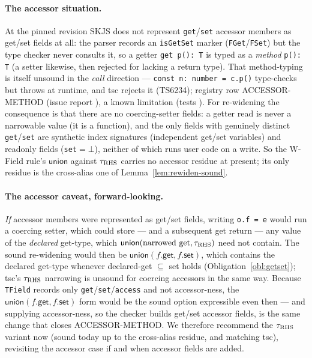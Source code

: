 \documentclass[11pt]{article}
\begin{document}
\paragraph{The accessor situation.}
At the pinned revision SKJS does not represent \texttt{get}/\texttt{set}
accessor members as get/set fields at all: the parser records an
\texttt{isGetSet} marker (\texttt{FGet}/\texttt{FSet}) but the type
checker never consults it, so a getter \texttt{get p(): T} is typed as a
\emph{method} \texttt{p(): T} (a setter likewise, then rejected for
lacking a return type). That method-typing is itself unsound in the
\emph{call} direction --- \texttt{const n: number = c.p()} type-checks
but throws at runtime, and tsc rejects it (TS6234); registry row
ACCESSOR-METHOD (issue report ), a known
limitation (tests ). For
re-widening the consequence is that there are no coercing-setter fields:
a getter read is never a narrowable value (it is a function), and the
only fields with genuinely distinct \texttt{get}/\texttt{set} are
synthetic index signatures (independent get/set variables) and readonly
fields (\texttt{set}${=}\bot$), neither of which runs user code on a
write. So the W-Field rule's $\mathsf{union}$ against $\tau_{\rm RHS}$
carries no accessor residue at present; its only residue is the
cross-alias one of Lemma~\ref{lem:rewiden-sound}.

\paragraph{The accessor caveat, forward-looking.}
\emph{If} accessor members were represented as get/set fields, writing
\texttt{o.f = e} would run a coercing setter, which could store --- and a
subsequent get return --- any value of the \emph{declared} get-type,
which $\mathsf{union}(\text{narrowed get}, \tau_{\rm RHS})$ need not
contain. The sound re-widening would then be
$\mathsf{union}(f.\mathsf{get}, f.\mathsf{set})$, which contains the
declared get-type whenever declared-get $\subseteq$ set holds
(Obligation~\ref{obl:getset}); tsc's $\tau_{\rm RHS}$ narrowing is unsound
for coercing accessors in the same way. Because \texttt{TField} records
only \texttt{get}/\texttt{set}/\texttt{access} and not accessor-ness, the
$\mathsf{union}(f.\mathsf{get}, f.\mathsf{set})$ form would be the sound
option expressible even then --- and supplying accessor-ness, so the
checker builds get/set accessor fields, is the same change that closes
ACCESSOR-METHOD. We therefore recommend the $\tau_{\rm RHS}$ variant now
(sound today up to the cross-alias residue, and matching tsc), revisiting
the accessor case if and when accessor fields are added.
\end{document}

